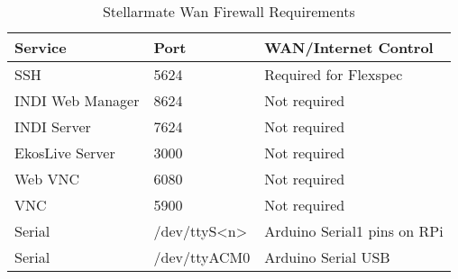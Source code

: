 \begin{table}[h!]
\centering
\begin{tabular}{| l | l | l |}
\hline
Service           & Port            &  WAN/Internet Control        \\ 
\hline
SSH               & 5624            & Required for Flexspec        \\ 
INDI Web Manager  & 8624            & Not required                 \\ 
INDI Server       & 7624            & Not required                 \\ 
EkosLive Server   & 3000            & Not required                 \\ 
Web VNC           & 6080            & Not required                 \\ 
VNC               & 5900            & Not required                 \\ 
Serial            & /dev/ttyS<n>    & Arduino Serial1 pins on RPi  \\ 
Serial            & /dev/ttyACM0    & Arduino Serial USB           \\ 
\hline
\end{tabular}
\caption[Stellarmate Wan Ports]{Stellarmate Wan Firewall Requirements}
\label{table:StellarmateWanFirewallRequirements}
\end{table}
